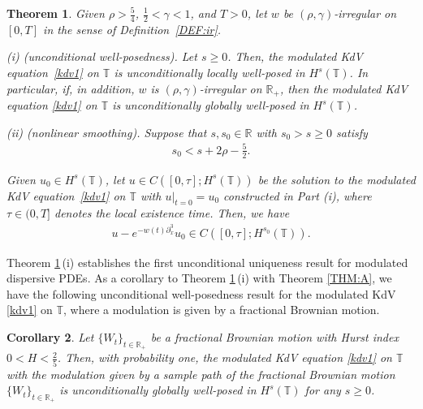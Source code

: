 \documentclass[letterpaper, 11pt,  reqno]{amsart}
\newtheorem{theorem}{Theorem} [section]
\newtheorem{corollary}[theorem]{Corollary}
\newcommand{\1}{\hspace{0.5mm}\text{I}\hspace{0.5mm}}
\newcommand{\noi}{\noindent}
\newcommand{\R}{\mathbb{R}}
\newcommand{\T}{\mathbb{T}}
\newcommand{\g}{\gamma}
\newcommand{\dx}{\partial_x}
\numberwithin{equation}{section}
\numberwithin{theorem}{section}
\begin{document}
\begin{theorem}\label{THM:UU1}
Given $\rho > \frac 54$,  $\frac12< \g < 1$, and $T> 0$, 
let  $w$ be $(\rho,\g)$-irregular on $[0, T]$ in the sense of Definition~\ref{DEF:ir}.


\smallskip

\noi
\textup{(i) (unconditional well-posedness).} 
Let   $s\ge 0$.
Then, the modulated KdV equation~\eqref{kdv1}
on  $\T$
is unconditionally locally well-posed in $H^s(\T)$.
In particular, 
if, in addition, $w$ is  $(\rho,\g)$-irregular  on $\R_+$, 
then the modulated KdV equation \eqref{kdv1}
on  $\T$
is unconditionally globally well-posed in $H^s(\T)$.

\smallskip

\noi
\textup{(ii) (nonlinear smoothing).} 
Suppose that %
$s, s_0 \in \R$ with 
$s_0 > s\ge 0$   satisfy
\begin{align*}
s_0 < s + 2\rho - \frac 52.
\end{align*}



\noi
Given $u_0 \in H^s(\T)$, 
let $u
\in C([0, \tau]; H^s(\T))$ be the  solution 
to the modulated KdV equation~\eqref{kdv1}
on $\T$
with $u|_{t = 0} = u_0$
constructed in Part (i), 
where 
$\tau \in (0,  T]$ denotes the local existence time.
Then, we have 
\begin{align*}
 u - e^{-w(t) \dx^3}u_0 \in C([0, \tau]; H^{s_0}(\T)).
\end{align*}



\end{theorem}

Theorem \ref{THM:UU1}\,(i) establishes the first unconditional uniqueness
result for modulated dispersive PDEs.
As a corollary to Theorem \ref{THM:UU1}\,(i)
with Theorem \ref{THM:A}, we have
the following unconditional well-posedness
result for the modulated KdV \eqref{kdv1} on $\T$, 
where a modulation is given by a fractional Brownian motion.







\begin{corollary}\label{COR:1}
Let $\{W_t\}_{t\in \R_+}$ be a fractional Brownian motion 
with Hurst index $0 < H < \frac 25$.
Then, 
with probability one, 
the modulated KdV equation \eqref{kdv1}
on  $\T$
with the modulation given by 
a sample path of the
 fractional Brownian motion 
 $\{W_t\}_{t\in \R_+}$
is unconditionally globally well-posed in $H^s(\T)$
for any $s \ge 0$.




\end{corollary}
\end{document}
